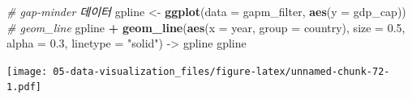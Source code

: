 \documentclass[
  11pt,
]{krantz}
\newenvironment{Shaded}{\begin{snugshade}}{\end{snugshade}}
\newcommand{\CommentTok}[1]{\textcolor[rgb]{0.37,0.37,0.37}{\textit{#1}}}
\newcommand{\DataTypeTok}[1]{\textcolor[rgb]{0.27,0.27,0.27}{#1}}
\newcommand{\DecValTok}[1]{\textcolor[rgb]{0.06,0.06,0.06}{#1}}
\newcommand{\FloatTok}[1]{\textcolor[rgb]{0.06,0.06,0.06}{#1}}
\newcommand{\KeywordTok}[1]{\textcolor[rgb]{0.27,0.27,0.27}{\textbf{#1}}}
\newcommand{\NormalTok}[1]{#1}
\newcommand{\OperatorTok}[1]{\textcolor[rgb]{0.43,0.43,0.43}{\textbf{#1}}}
\newcommand{\StringTok}[1]{\textcolor[rgb]{0.5,0.5,0.5}{#1}}
\begin{document}
\footnotesize

\begin{Shaded}
\begin{Highlighting}[]
\CommentTok{# gap-minder 데이터}
\NormalTok{gpline <-}\StringTok{ }\KeywordTok{ggplot}\NormalTok{(}\DataTypeTok{data =}\NormalTok{ gapm_filter, }
                  \KeywordTok{aes}\NormalTok{(}\DataTypeTok{y =}\NormalTok{ gdp_cap)) }
\CommentTok{# geom_line}
\NormalTok{gpline }\OperatorTok{+}\StringTok{ }
\StringTok{  }\KeywordTok{geom_line}\NormalTok{(}\KeywordTok{aes}\NormalTok{(}\DataTypeTok{x =}\NormalTok{ year, }
                \DataTypeTok{group =}\NormalTok{ country), }
            \DataTypeTok{size =} \FloatTok{0.5}\NormalTok{, }
            \DataTypeTok{alpha =} \FloatTok{0.3}\NormalTok{, }
            \DataTypeTok{linetype =} \StringTok{"solid"}\NormalTok{) ->}\StringTok{ }\NormalTok{gpline}
\NormalTok{gpline}
\end{Highlighting}
\end{Shaded}

\texttt{[image: 05-data-visualization\_files/figure-latex/unnamed-chunk-72-1.pdf]}

\normalsize

\footnotesize

\begin{Shaded}
\end{Shaded}
\end{document}
